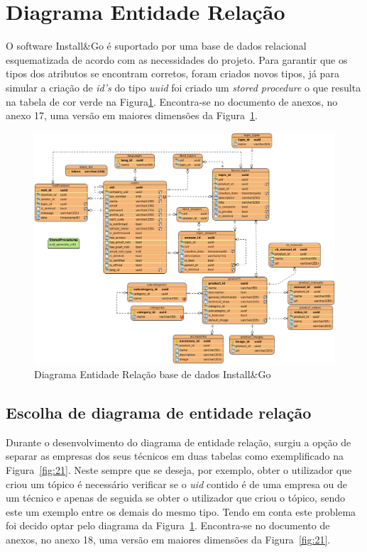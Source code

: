 \section{Diagrama Entidade Relação}

O software Install\&Go é suportado por uma base de dados relacional esquematizada de acordo com as necessidades do projeto. Para garantir que os tipos dos atributos se encontram corretos, foram criados novos tipos, já para simular a criação de \textit{id's} do tipo \textit{uuid} foi criado um \textit{stored procedure} o que resulta na tabela de cor verde na Figura\ref{fig:20}. Encontra-se no documento de anexos, no anexo 17, uma versão em maiores dimensões da Figura~\ref*{fig:20}.


\begin{figure}[htb]
  \centering
  
  \includegraphics[width=\textwidth]{images/diagramas/diagrama_bd.png}
  \caption{Diagrama Entidade Relação base de dados Install\&Go}
  \label{fig:20}
\end{figure}

\newpage

\subsection{Escolha de diagrama de entidade relação}
Durante o desenvolvimento do diagrama de entidade relação, surgiu 
a opção de separar as empresas dos seus técnicos em duas tabelas como 
exemplificado na Figura~\ref{fig:21}. Neste sempre que se
deseja, por exemplo, obter o utilizador que criou um tópico é necessário
verificar se o \textit{uid} contido é de uma empresa ou de um técnico e apenas de seguida se obter o utilizador que criou o tópico, sendo este um exemplo entre os demais do mesmo tipo. Tendo em conta este problema foi decido optar pelo diagrama da Figura~\ref{fig:20}. Encontra-se no documento de anexos, no anexo 18, uma versão em maiores dimensões da Figura~\ref*{fig:21}.


